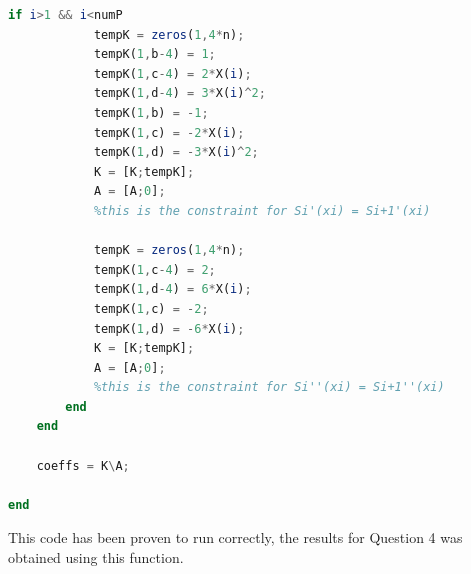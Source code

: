 \documentclass[11pt]{article} %
\begin{document}
\begin{lstlisting}[language=Octave]
        if i>1 && i<numP
            tempK = zeros(1,4*n);
            tempK(1,b-4) = 1;
            tempK(1,c-4) = 2*X(i);
            tempK(1,d-4) = 3*X(i)^2;
            tempK(1,b) = -1;
            tempK(1,c) = -2*X(i);
            tempK(1,d) = -3*X(i)^2;
            K = [K;tempK];
            A = [A;0];
            %this is the constraint for Si'(xi) = Si+1'(xi)
            
            tempK = zeros(1,4*n);
            tempK(1,c-4) = 2;
            tempK(1,d-4) = 6*X(i);
            tempK(1,c) = -2;
            tempK(1,d) = -6*X(i);
            K = [K;tempK];
            A = [A;0];
            %this is the constraint for Si''(xi) = Si+1''(xi)
        end
    end
    
    coeffs = K\A;
    
end
\end{lstlisting}

This code has been proven to run correctly, the results for Question 4 was obtained using this function.
\end{document}
